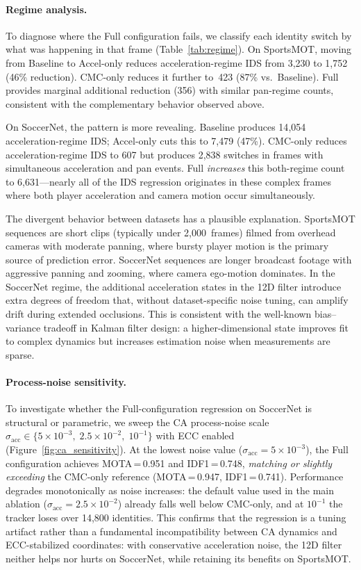 \paragraph{Regime analysis.}
To diagnose where the Full configuration fails, we classify each identity
switch by what was happening in that frame (Table~\ref{tab:regime}). On
SportsMOT, moving from Baseline to Accel-only reduces acceleration-regime
IDS from 3{,}230 to 1{,}752 (46\% reduction). CMC-only reduces it further
to~423 (87\% vs.\ Baseline). Full provides marginal additional reduction
(356) with similar pan-regime counts, consistent with the complementary
behavior observed above.

On SoccerNet, the pattern is more revealing. Baseline produces 14{,}054
acceleration-regime IDS; Accel-only cuts this to 7{,}479 (47\%). CMC-only
reduces acceleration-regime IDS to 607 but produces 2{,}838 switches in
frames with simultaneous acceleration and pan events. Full \emph{increases}
this both-regime count to 6{,}631---nearly all of the IDS regression
originates in these complex frames where both player acceleration and camera
motion occur simultaneously.

The divergent behavior between datasets has a plausible explanation.
SportsMOT sequences are short clips (typically under 2{,}000~frames) filmed
from overhead cameras with moderate panning, where bursty player motion is
the primary source of prediction error. SoccerNet sequences are longer
broadcast footage with aggressive panning and zooming, where camera
ego-motion dominates. In the SoccerNet regime, the additional acceleration
states in the 12D filter introduce extra degrees of freedom that, without
dataset-specific noise tuning, can amplify drift during extended occlusions.
This is consistent with the well-known bias--variance tradeoff in Kalman
filter design: a higher-dimensional state improves fit to complex dynamics
but increases estimation noise when measurements are sparse.

\paragraph{Process-noise sensitivity.}
To investigate whether the Full-configuration regression on SoccerNet is
structural or parametric, we sweep the CA process-noise scale
$\sigma_\mathrm{acc} \in \{5 \times 10^{-3},\; 2.5 \times 10^{-2},\;
10^{-1}\}$ with ECC enabled (Figure~\ref{fig:ca_sensitivity}).
At the lowest noise value ($\sigma_\mathrm{acc} = 5 \times 10^{-3}$),
the Full configuration achieves MOTA\,=\,0.951 and IDF1\,=\,0.748,
\emph{matching or slightly exceeding} the CMC-only reference
(MOTA\,=\,0.947, IDF1\,=\,0.741). Performance degrades monotonically
as noise increases: the default value used in the main ablation
($\sigma_\mathrm{acc} = 2.5 \times 10^{-2}$) already falls well below
CMC-only, and at $10^{-1}$ the tracker loses over 14{,}800 identities.
This confirms that the regression is a tuning artifact rather than a
fundamental incompatibility between CA dynamics and ECC-stabilized
coordinates: with conservative acceleration noise, the 12D filter
neither helps nor hurts on SoccerNet, while retaining its benefits on
SportsMOT.

